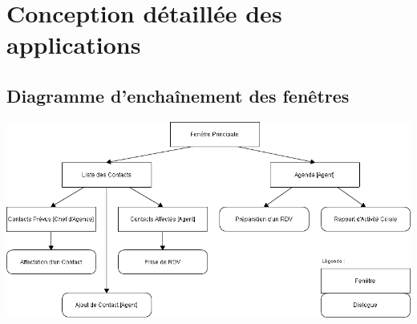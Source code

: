 
\section{Conception détaillée des applications}

\subsection{Diagramme d'enchaînement des fenêtres}

\begin {center}
\includegraphics[width=\textwidth]{diagramme-edf.png}
\end {center}
